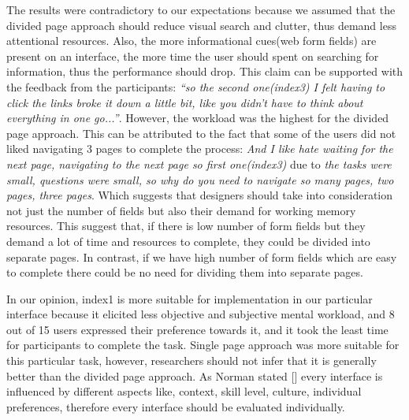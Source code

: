 \documentclass[../main/Replicate.tex]{subfiles}
\begin{document}
	
	The results were contradictory to our expectations because we assumed that the divided page approach should reduce visual search and clutter, thus demand less attentional resources. Also, the more informational cues(web form fields) are present on an interface, the more time the user should spent on searching for information, thus the performance should drop. This claim can be supported with the feedback from the participants: \textit{``so the second one(index3) I felt having to click the links broke it down a little bit, like you didn't have to think about everything in one go...''}. However, the workload was the highest for the divided page approach. This can be attributed to the fact that some of the users did not liked navigating 3 pages to complete the process: \textit{And I like hate waiting for the next
	page, navigating to the next page so first one(index3)} due to \textit{the tasks were small, questions were small, so why do you need to navigate so many pages, two pages, three pages}. Which suggests that designers should take into consideration not just the number of fields but also their demand for working memory resources. This suggest that, if there is low number of form fields but they demand a lot of time and resources to complete, they could be divided into separate pages. In contrast, if we have high number of form fields which are easy to complete there could be no need for dividing them into separate pages.

	In our opinion, index1 is more suitable for implementation in our particular interface because it elicited less objective and subjective mental workload, and 8 out of 15 users expressed their preference towards it, and it took the least time for participants to complete the task. Single page approach was more suitable for this particular task, however, researchers should not infer that it is generally better than the divided page approach. As Norman stated [] every interface is influenced by different aspects like, context, skill level, culture, individual preferences, therefore every interface should be evaluated individually. 

\end{document}
